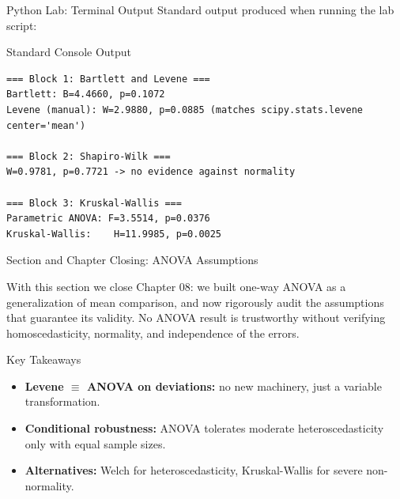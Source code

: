 \documentclass[10pt, aspectratio=169]{beamer}
\begin{document}
\begin{frame}[fragile]{Python Lab: Terminal Output}
  \scriptsize
  Standard output produced when running the lab script:
  \vspace{0.02cm}
  \begin{block}{Standard Console Output}
    \fontsize{3.8pt}{4.6pt}\selectfont
    \begin{verbatim}
=== Block 1: Bartlett and Levene ===
Bartlett: B=4.4660, p=0.1072
Levene (manual): W=2.9880, p=0.0885 (matches scipy.stats.levene center='mean')

=== Block 2: Shapiro-Wilk ===
W=0.9781, p=0.7721 -> no evidence against normality

=== Block 3: Kruskal-Wallis ===
Parametric ANOVA: F=3.5514, p=0.0376
Kruskal-Wallis:    H=11.9985, p=0.0025
    \end{verbatim}
  \end{block}
\end{frame}


\begin{frame}{Section and Chapter Closing: ANOVA Assumptions}
  \begin{reflexion}
    With this section we close Chapter 08: we built one-way ANOVA as a generalization of mean comparison, and now rigorously audit the assumptions that guarantee its validity. No ANOVA result is trustworthy without verifying homoscedasticity, normality, and independence of the errors.
  \end{reflexion}

  \vspace{0.2cm}
  \pause
  \begin{block}{Key Takeaways}
    \begin{itemize}\itemsep=0.08cm
      \item \textbf{Levene $\equiv$ ANOVA on deviations:} no new machinery, just a variable transformation.
      \item \textbf{Conditional robustness:} ANOVA tolerates moderate heteroscedasticity only with equal sample sizes.
      \item \textbf{Alternatives:} Welch for heteroscedasticity, Kruskal-Wallis for severe non-normality.
    \end{itemize}
  \end{block}
\end{frame}
\end{document}
